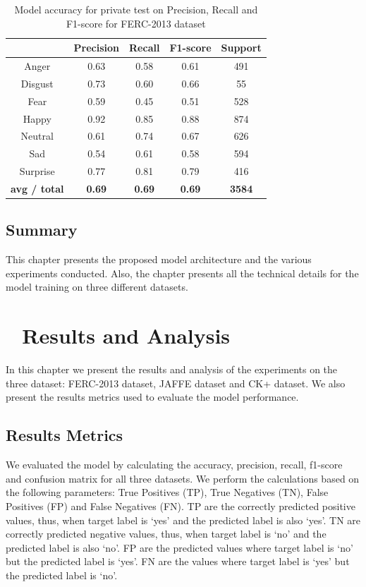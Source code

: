 \documentclass[master]{thesis-uestc}
\begin{document}
\begin{table}[ht]
\renewcommand{\arraystretch}{1.3}
\caption{Model accuracy for private test on Precision, Recall and F1-score for FERC-2013 dataset}
\label{table_fer2013_scores_private}
\begin{center}
\begin{tabular}{|c|c|c|c|c|}

\hline
 & Precision & Recall & F1-score & Support\\ \hline

Anger & 0.63 & 0.58 & 0.61 & 491\\ \hline
Disgust & 0.73 & 0.60 & 0.66 & 55\\ \hline
Fear & 0.59 & 0.45 & 0.51 & 528\\ \hline
Happy & 0.92 & 0.85 & 0.88 & 874\\ \hline
Neutral & 0.61 & 0.74 & 0.67 & 626\\ \hline
Sad & 0.54 & 0.61 & 0.58 & 594\\ \hline
Surprise & 0.77 & 0.81 & 0.79 & 416\\ \hline

\textbf{avg / total} & \textbf{0.69} & \textbf{0.69} & \textbf{0.69} & \textbf{3584}\\ \hline
\end{tabular}
\end{center}
\end{table}

\section{Summary}
This chapter presents the proposed model architecture and the various experiments conducted. Also, the chapter presents all the technical details for the model training on three different datasets.

\chapter{\,\,\,\,\,\textbf{Results and Analysis}}\label{chp4}
In this chapter we present the results and analysis of the experiments on the three dataset: FERC-2013 dataset, JAFFE dataset and CK+ dataset. We also present the results metrics used to evaluate the model performance.
\section{Results Metrics}
We evaluated the model by calculating the accuracy, precision, recall, f1-score and confusion matrix\cite{FAWCETT2006861} for all three datasets. We perform the calculations based on the following parameters: True Positives (TP), True Negatives (TN), False Positives (FP) and False Negatives (FN). TP are the correctly predicted positive values, thus, when target label is `yes' and the predicted label is also `yes'. TN are correctly predicted negative values, thus, when target label is `no' and the predicted label is also `no'. FP are the predicted values where target label is `no' but the predicted label is `yes'. FN are the values where target label is `yes' but the predicted label is `no'.
\end{document}
